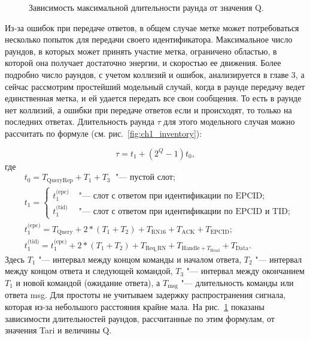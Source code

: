 \begin{figure}[!t]
	\caption{Зависимость максимальной длительности раунда от значения Q.}
	\label{fig:ch2_round_durations}
\end{figure}


Из-за ошибок при передаче ответов, в общем случае метке может потребоваться несколько попыток для передачи своего идентификатора. Максимальное число раундов, в которых может принять участие метка, ограничено областью, в которой она получает достаточно энергии, и скоростью ее движения. Более подробно число раундов, с учетом коллизий и ошибок, анализируется в главе 3, а сейчас рассмотрим простейший модельный случай, когда в раунде передачу ведет единственная метка, и ей удается передать все свои сообщения. То есть в раунде нет коллизий, а ошибки при передаче ответов если и происходят, то только на последних ответах. Длительность раунда $\tau$ для этого модельного случая можно рассчитать по формуле (см. рис.~\ref{fig:ch1_inventory}):

$$
	\tau = t_1 + (2^Q - 1) t_0,
$$
где
$$
	\begin{aligned}
		&t_0 = T_{\text{QueryRep}} + T_1 + T_3\;\text{ "--- пустой слот};\\
		&t_1 = \begin{cases}
			t_1^{\text{(epc)}} &\text{ "--- слот с ответом при идентификации по EPCID};\\
			t_1^{\text{(tid)}} &\text{ "--- слот с ответом при идентификации по EPCID и TID};
		\end{cases}\\
		&t_1^{\text{(epc)}} = T_{\text{Query}} + 2 * (T_1 + T_2) + T_{\text{RN16}} +
			T_{\text{ACK}} + T_{\text{EPCID}};\\
		&t_1^{\text{(tid)}} = t_1^{\text{(epc)}} + 2 * (T_1 + T_2) + T_{\text{Req\_RN}} +
			T_{\text{Handle} + T_{\text{Read}}} + T_{\text{Data}}.
	\end{aligned}
$$
Здесь $T_1$ "--- интервал между концом команды и началом ответа, $T_2$ "--- интервал между концом ответа и следующей командой, $T_3$ "--- интервал между окончанием $T_1$ и новой командой (ожидание ответа), а $T_{\text{msg}}$ "--- длительность команды или ответа msg. Для простоты не учитываем задержку распространения сигнала, которая из-за небольшого расстояния крайне мала. На рис.~\ref{fig:ch2_round_durations} показаны зависимости длительностей раундов, рассчитанные по этим формулам, от значения Tari и величины Q.

